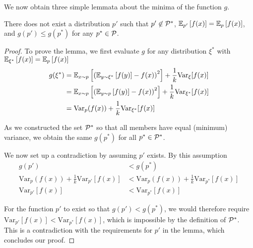 We now obtain three simple lemmata about the minima of the function $g$.

\begin{lemma}\label{lemma:cvaml:3}
There does not exist a distribution $p'$ such that $p'\not\in \P^*$, $\EEX{p'}{f(x)} = \EEX{p}{f(x)}$, and $g(p') \leq g(p^*)$ for any $p^*\in\P$.
\end{lemma}

\begin{proof}
    To prove the lemma, we first evaluate $g$ for any distribution $\xi^*$ with $\EEX{\xi^*}{f(x)} = \EEX{p}{f(x)}$ 
    \begin{align}
        g(\xi^*) &= \EEX{x \sim p}{\left(\EEX{y \sim \xi^*}{f(y)} - f(x)\right)^2} + \frac{1}{k}\mathrm{Var}_\xi[f(x)]\\
        &= \EEX{x \sim p}{\left(\EEX{y \sim p}{f(y)} - f(x)\right)^2} + \frac{1}{k}\mathrm{Var}_{\xi^*}[f(x)]\\
        &= \mathrm{Var}_{p}(f(x)) + \frac{1}{k}\mathrm{Var}_{\xi^*}[f(x)]
    \end{align}
    
    As we constructed the set $\P^*$ so that all members have equal (minimum) variance, we obtain the same $g(p^*)$ for all $p^*\in\P^*$.

    We now set up a contradiction by assuming $p'$ exists. By this assumption
    \begin{align}
        g(p') &< g(p^*) \\
        \mathrm{Var}_{p}(f(x)) + \frac{1}{k}\mathrm{Var}_{p'}[f(x)] &< \mathrm{Var}_{p}(f(x)) + \frac{1}{k}\mathrm{Var}_{p^*}[f(x)]\\
        \mathrm{Var}_{p'}[f(x)] &< \mathrm{Var}_{p^*}[f(x)]
    \end{align}

    For the function $p'$ to exist so that $g(p') < g(p^*)$, we would therefore require $\mathrm{Var}_{p'}[f(x)] < \mathrm{Var}_{p^*}[f(x)]$, which is impossible by the definition of $\P^*$.
    This is a contradiction with the requirements for $p'$ in the lemma, which concludes our proof.
\end{proof}

